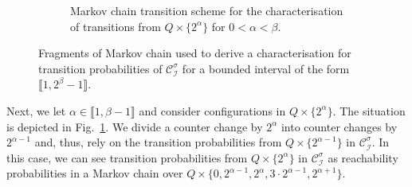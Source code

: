 \documentclass[a4paper,UKenglish,cleveref,autoref,thm-restate,colorlinks]{lipics-v2021}
\newcommand{\integerInterval}[1]{\llbracket{}#1\rrbracket{}}
\newcommand{\ocStateSpace}{Q}
\newcommand{\mchain}{\mathcal{C}}
\newcommand{\intPart}{\mathcal{I}}
\newcommand{\powerIndex}{\alpha}
\newcommand{\powerMax}{\beta}
\newcommand{\compressChainStrat}[1]{\mchain^{#1}_{\intPart}}
\newcommand{\compressChain}{\compressChainStrat{\strat}}
\newcommand{\stratGeneric}[1]{{\sigma_{#1}}}
\newcommand{\strat}{\stratGeneric{}}
\begin{document}
\begin{figure}
\begin{subfigure}[t]{0.5\textwidth}
{
      }
      \caption{Markov chain transition scheme for the characterisation of transitions from $\ocStateSpace\times\{2^\powerIndex\}$ for $0<\powerIndex<\powerMax$.}
      \label{figure:equations:bounded:induction}
    \end{subfigure}
    \caption{Fragments of Markov chain used to derive a characterisation for transition probabilities of $\compressChain$ for a bounded interval of the form $\integerInterval{1, 2^\powerMax-1}$.
    }\label{figure:equations:bounded}
  \end{figure}

Next, we let $\powerIndex\in\integerInterval{1, \powerMax-1}$ and consider configurations in $\ocStateSpace\times\{2^{\powerIndex}\}$. The situation is depicted in  Fig.~\ref{figure:equations:bounded:induction}.
We divide a counter change by $2^\powerIndex$ into counter changes by $2^{\powerIndex-1}$ and, thus, rely on the transition probabilities  from $\ocStateSpace\times\{2^{\powerIndex-1}\}$ in $\compressChain$.
In this case, we can see transition probabilities from $\ocStateSpace\times\{2^\powerIndex\}$ in $\compressChain$ as reachability probabilities in a Markov chain over $\ocStateSpace\times\{0, 2^{\powerIndex-1}, 2^{\powerIndex},3\cdot2^{\powerIndex-1},2^{\powerIndex+1}\}$.
\end{document}
